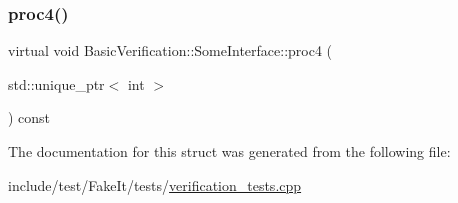 \mbox{\label{structBasicVerification_1_1SomeInterface_a64b6c8a98b24ea075e4198eec8f4e393}} 
\subsubsection{\texorpdfstring{proc4()}{proc4()}}
{\footnotesize\ttfamily virtual void Basic\+Verification\+::\+Some\+Interface\+::proc4 (\begin{DoxyParamCaption}\item[{std\+::unique\+\_\+ptr$<$ int $>$}]{ }\end{DoxyParamCaption}) const\hspace{0.3cm}{\ttfamily [pure virtual]}}



The documentation for this struct was generated from the following file\+:\begin{DoxyCompactItemize}
\item 
include/test/\+Fake\+It/tests/\mbox{\hyperlink{verification__tests_8cpp}{verification\+\_\+tests.\+cpp}}\end{DoxyCompactItemize}
